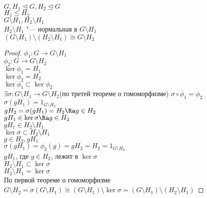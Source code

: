 \begin{theorem}
$G, H_1 \unlhd G, H_2 \unlhd G$\\
$H_1 \le H_2$\\
$G\setminus H_1, H_2 \setminus H_1$\\
$H_2 \setminus H_1$  "--- нормальная в $G \setminus H_1$\\
$(G \setminus H_1)\setminus(H_2 \setminus H_1) \cong G \setminus H_2$\\
\end{theorem}
\begin{proof}
$\phi_1 \colon G \to G \setminus H_1$\\
$\phi_2 \colon G \to G \setminus H_2$\\
$\ker \phi_1 = H_1$\\
$\ker \phi_2 = H_2$\\
$\ker \phi_1 \subset \ker \phi_2$\\
$\exists \sigma \colon G \setminus H_1 \to G \setminus H_2$(по третей теореме о гомоморфизме)
$\sigma \circ \phi_1 = \phi_2$\\
$\sigma(gH_1) = 1_{G \setminus H_2}$\\
$gH_2 = \sigma(gH_1) = H_2 \Ra g \in H_2$\\

$gH_1 \in \ker \sigma \Ra g \in H_2$\\
$gH_1 \in H_2 \setminus H_1$\\
$\ker \sigma \subset H_2 \setminus H_1$\\

$g \in H_2, gH_1$\\
$\sigma(gH_1) = \phi_2(g) = gH_2 = H_2 = 1_{G\setminus H_2}$\\
$gH_1$, где $g \in H_2$, лежит в $\ker \sigma$\\
$H_2 \setminus H_1 \subset \ker \sigma$\\
$H_2 \setminus H_1 = \ker \sigma$\\

По первой теореме о гомоморфизме 
$G \setminus H_2 = \sigma (G \setminus H_1) \cong (G \setminus H_1)\setminus \ker \sigma = (G\setminus H_1)\setminus(H_2 \setminus H_1)$

\end{proof}

